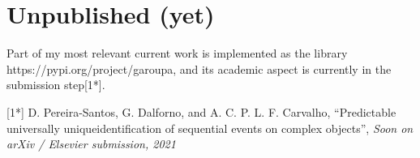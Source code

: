    \section{Unpublished (yet)}
   Part of my most relevant current work is implemented as the library https://pypi.org/project/garoupa, and its academic aspect is currently in the submission step[1*].
\vspace{0.5cm}

[1*] D. Pereira-Santos, G. Dalforno, and A. C. P. L. F. Carvalho, “Predictable universally uniqueidentification of sequential events on complex objects”, \textit{Soon on arXiv / Elsevier submission, 2021}

\nocite{*}
\printbibliography[title=Publications]

